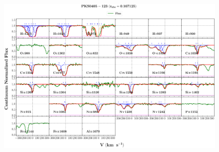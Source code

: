 \documentclass[12pt]{report}
\begin{document}
\begin{landscape}

    \begin{figure}
        \centering
        \vspace{-20mm}
        \hspace*{-35mm}
        \includegraphics[width=1.25\linewidth]{sys_plots_full/PKS0405-123_z=0.167125_sys_plot_full.png}
    \end{figure}
    
\end{landscape}
\end{document}
